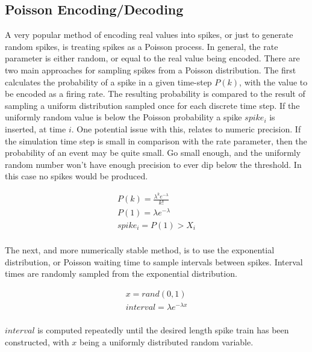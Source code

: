     \subsection{Poisson Encoding/Decoding}
    A very popular method of encoding real values into spikes, or just to
    generate random spikes, is treating spikes as a Poisson process. In general,
    the rate parameter is either random, or equal to the real value being
    encoded. There are two main approaches for sampling spikes from a Poisson
    distribution. The first calculates the probability of a spike in a given
    time-step $P(k)$, with the value to be encoded as a firing rate. The
    resulting probability 
    is compared to the result of sampling a uniform distribution sampled once
    for each discrete time step. If the uniformly random value is below the
    Poisson probability a spike $spike_i$ is inserted, at time $i$. One potential issue
    with this, relates to numeric precision. If the simulation time step is
    small in comparison with the rate parameter, then the probability of an
    event may be quite small. Go small enough, and the uniformly random number
    won't have enough precision to ever dip below the threshold. In this case no
    spikes would be produced.
    
    
    \begin{align}
        P(k) = \frac{\lambda^k e^{-\lambda}}{k!} \\ P(1) = \lambda e^{-\lambda} \\
        spike_i = P(1) > X_i \\
    \end{align}
    
    The next, and more numerically stable method, is to use the exponential
    distribution, or Poisson waiting time to sample intervals between
    spikes. Interval times are randomly sampled from the exponential
    distribution.
    
    \begin{align}
      x = rand(0,1) \\
      interval = \lambda e^{-\lambda x} \\
    \end{align}

    $interval$ is computed repeatedly until the desired length spike train has
    been constructed, with $x$ being a uniformly distributed random variable.
    
